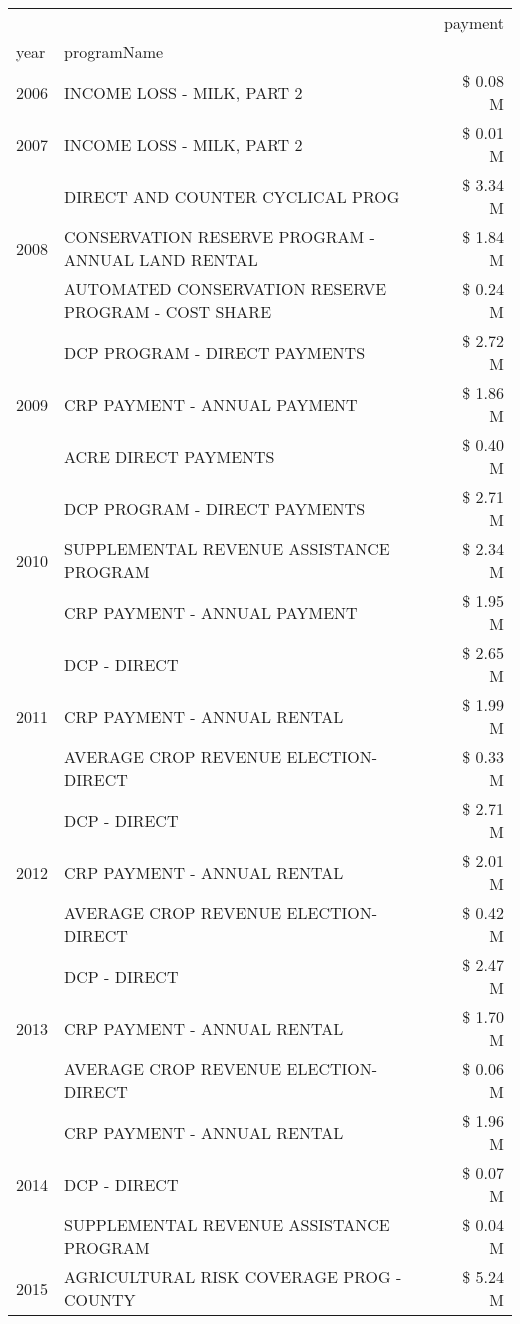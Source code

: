 \begin{tabular}{llr}
\toprule
 &  & payment \\
year & programName &  \\
\midrule
2006 & INCOME LOSS - MILK, PART 2 & \$ 0.08 M \\
\cline{1-3}
2007 & INCOME LOSS - MILK, PART 2 & \$ 0.01 M \\
\cline{1-3}
\multirow[t]{3}{*}{2008} & DIRECT AND COUNTER CYCLICAL PROG & \$ 3.34 M \\
 & CONSERVATION RESERVE PROGRAM - ANNUAL LAND RENTAL & \$ 1.84 M \\
 & AUTOMATED CONSERVATION RESERVE PROGRAM - COST SHARE & \$ 0.24 M \\
\cline{1-3}
\multirow[t]{3}{*}{2009} & DCP PROGRAM - DIRECT PAYMENTS & \$ 2.72 M \\
 & CRP PAYMENT - ANNUAL PAYMENT & \$ 1.86 M \\
 & ACRE DIRECT PAYMENTS & \$ 0.40 M \\
\cline{1-3}
\multirow[t]{3}{*}{2010} & DCP PROGRAM - DIRECT PAYMENTS & \$ 2.71 M \\
 & SUPPLEMENTAL REVENUE ASSISTANCE PROGRAM & \$ 2.34 M \\
 & CRP PAYMENT - ANNUAL PAYMENT & \$ 1.95 M \\
\cline{1-3}
\multirow[t]{3}{*}{2011} & DCP - DIRECT & \$ 2.65 M \\
 & CRP PAYMENT - ANNUAL RENTAL & \$ 1.99 M \\
 & AVERAGE CROP REVENUE ELECTION-DIRECT & \$ 0.33 M \\
\cline{1-3}
\multirow[t]{3}{*}{2012} & DCP - DIRECT & \$ 2.71 M \\
 & CRP PAYMENT - ANNUAL RENTAL & \$ 2.01 M \\
 & AVERAGE CROP REVENUE ELECTION-DIRECT & \$ 0.42 M \\
\cline{1-3}
\multirow[t]{3}{*}{2013} & DCP - DIRECT & \$ 2.47 M \\
 & CRP PAYMENT - ANNUAL RENTAL & \$ 1.70 M \\
 & AVERAGE CROP REVENUE ELECTION-DIRECT & \$ 0.06 M \\
\cline{1-3}
\multirow[t]{3}{*}{2014} & CRP PAYMENT - ANNUAL RENTAL & \$ 1.96 M \\
 & DCP - DIRECT & \$ 0.07 M \\
 & SUPPLEMENTAL REVENUE ASSISTANCE PROGRAM & \$ 0.04 M \\
\cline{1-3}
\multirow[t]{3}{*}{2015} & AGRICULTURAL RISK COVERAGE PROG - COUNTY & \$ 5.24 M \\

\end{tabular}
